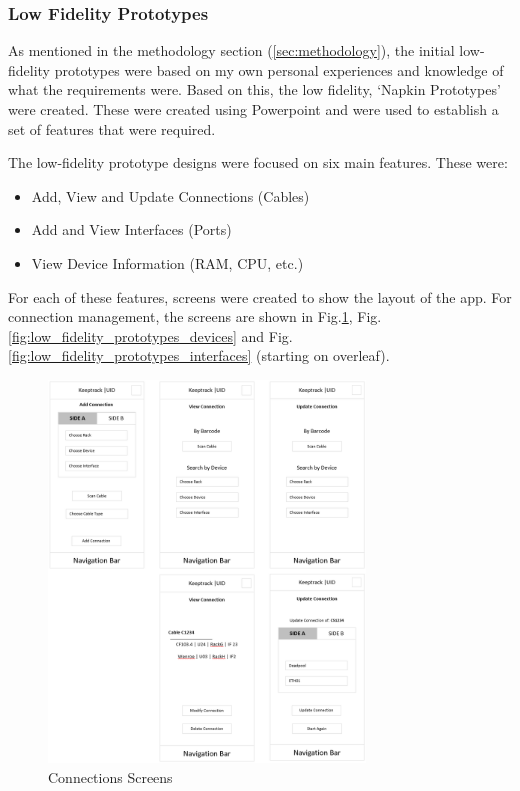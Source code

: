 \documentclass [11pt,a4paper]{article}
\begin{document}
\subsubsection{Low Fidelity Prototypes}
\label{sec:ui_design_initial_prototypes}
As mentioned in the methodology section (\ref{sec:methodology}), the initial low-fidelity prototypes were based on my own personal experiences and knowledge of what the requirements were. Based on this, the low fidelity, `Napkin Prototypes' were created. These were created using Powerpoint and were used to establish a set of features that were required. 

The low-fidelity prototype designs were focused on six main features. These were:
\begin{itemize}[noitemsep]
    \item Add, View and Update Connections (Cables)
    \item Add and View Interfaces (Ports)
    \item View Device Information (RAM, CPU, etc.)
\end{itemize}

For each of these features, screens were created to show the layout of the app. For connection management, the screens are shown in Fig.\ref{fig:low_fidelity_prototypes_connections}, Fig.\ref{fig:low_fidelity_prototypes_devices} and Fig.\ref{fig:low_fidelity_prototypes_interfaces} (starting on overleaf). 

\begin{figure}[H]
    \centering
    \includegraphics[width=0.75\textwidth]{images/initial_prototype_connections.png}
    \caption{Connections Screens}
    \label{fig:low_fidelity_prototypes_connections}
\end{figure}
\end{document}
